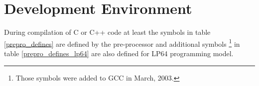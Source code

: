 
\chapter{Development Environment}

During compilation of C or C++ code at least the symbols in
table \ref{prepro_defines} are defined by the pre-processor and additional
symbols \footnote{Those symbols were added to GCC in March, 2003.} in table
\ref{prepro_defines_lp64} are also defined for LP64 programming model.

\begin{table}[H]
\Hrule
\caption{Predefined Pre-Processor Symbols}
\label{prepro_defines}
  \begin{center}\end{center}
\Hrule
\end{table}

\begin{table}[H]
\Hrule
\caption{Predefined Pre-Processor Symbols for LP64 Programming Model}
\label{prepro_defines_lp64}
  \begin{center}\end{center}
\Hrule
\end{table}

